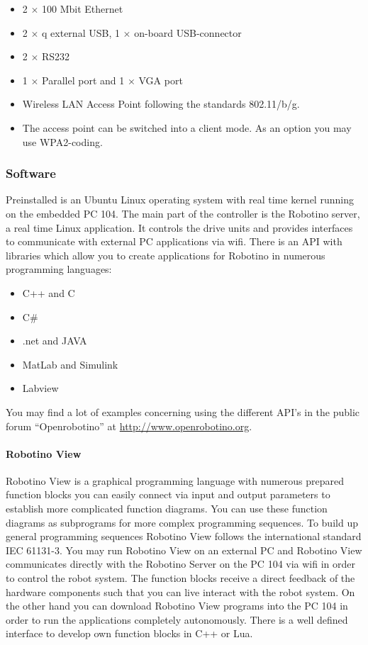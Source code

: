 \documentclass[12pt,twoside]{article}
\begin{document}
\begin{appendix}
\begin{itemize}
\item 2 $\times$ 100 Mbit Ethernet
\item 2 $\times$ q external USB, 1 $\times$ on-board USB-connector
\item 2 $\times$  RS232
\item 1 $\times$ Parallel port and 1 $\times$ VGA port
\item Wireless LAN Access Point following the standards 802.11/b/g.
\item The access point can be switched into a client mode.  As an
  option you may use WPA2-coding.
\end{itemize}

\subsubsection{Software}
Preinstalled is an Ubuntu Linux operating system with real time kernel
running on the embedded PC 104. The main part of the controller is the
Robotino server, a real time Linux application. It controls the drive
units and provides interfaces to communicate with external PC
applications via wifi. There is an API with libraries which allow you
to create applications for Robotino in numerous programming languages:

\begin{itemize}
	\item C++ and C 
	\item C\# 
	\item .net and JAVA 
	\item MatLab and Simulink
	\item Labview
\end{itemize}

You may find a lot of examples concerning using the different API's in
the public forum ``Openrobotino'' at
\url{http://www.openrobotino.org}.

\paragraph{Robotino View} 

Robotino View is a graphical programming language with numerous
prepared function blocks you can easily connect via input and output
parameters to establish more complicated function diagrams. You can use
these function diagrams as subprograms for more complex programming
sequences. To build up general programming sequences Robotino View
follows the international standard IEC 61131-3. You may run Robotino
View on an external PC and Robotino View communicates directly with
the Robotino Server on the PC 104 via wifi in order to control the
robot system. The function blocks receive a direct feedback of the
hardware components such that you can live interact with the robot
system. On the other hand you can download Robotino View programs into
the PC 104 in order to run the applications completely autonomously.
There is a well defined interface to develop own function blocks in C++
or Lua.


\end{appendix}
\end{document}
